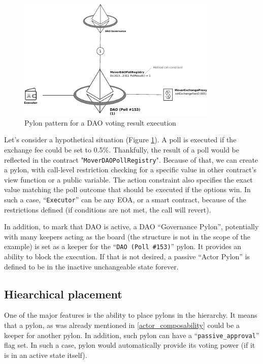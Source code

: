 \documentclass[12pt]{article}
\begin{document}
\begin{figure}[h!]
  \begin{center}
    \includegraphics[width=0.85\textwidth]{pylon_example_dao.pdf}
    \caption[Figure 1]{Pylon pattern for a DAO voting result execution
    \label{fig:pylon_example_dao}}
  \end{center}
\end{figure}

Let’s consider a hypothetical situation (Figure \ref{fig:pylon_example_dao}). A poll is executed if the exchange fee could be set to 0.5\%. Thankfully, the result of a poll would be reflected in the contract "\texttt{MoverDAOPollRegistry}". Because of that, we can create a pylon, with call-level restriction checking for a specific value in other contract’s view function or a public variable. The action constraint also specifies the exact value matching the poll outcome that should be executed if the options win. In such a case, ``\texttt{Executor}'' can be any EOA, or a smart contract, because of the restrictions defined (if conditions are not met, the call will revert).

In addition, to mark that DAO is active, a DAO ``Governance Pylon'', potentially with many keepers acting as the board (the structure is not in the scope of the example) is set as a keeper for the ``\texttt{DAO (Poll \#153)}'' pylon. It provides an ability to block the execution. If that is not desired, a passive ``Actor Pylon'' is defined to be in the inactive unchangeable state forever.


\pagebreak
\subsection{Hiearchical placement}
One of the major features is the ability to place pylons in the hierarchy. It means that a pylon, as was already mentioned in \ref{actor_composability} could be a keeper for another pylon. In addition, such pylon can have a ``\texttt{passive\_approval}'' flag set. In such a case, pylon would automatically provide its voting power (if it is in an active state itself).
\end{document}
